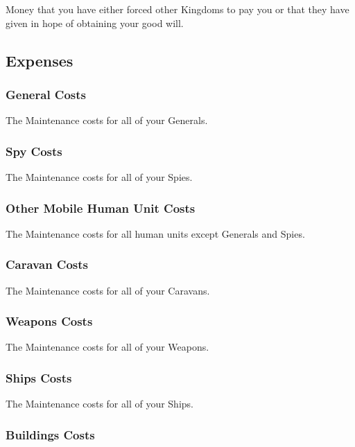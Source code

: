 {Money that you have either forced other Kingdoms to pay you or that they have given in hope of obtaining your good will.

\subsection{\textsf{Expenses}}


\subsubsection{\textsf{General Costs}}

The Maintenance costs for all of your Generals.

\subsubsection{\textsf{Spy Costs}}

The Maintenance costs for all of your Spies.

\subsubsection{\textsf{Other Mobile Human Unit Costs}}

The Maintenance costs for all human units except Generals and Spies.

\subsubsection{\textsf{Caravan Costs}}

The Maintenance costs for all of your Caravans.

\subsubsection{\textsf{Weapons Costs}}

The Maintenance costs for all of your Weapons.

\subsubsection{\textsf{Ships Costs}}

The Maintenance costs for all of your Ships.

\subsubsection{\textsf{Buildings Costs}}

}
